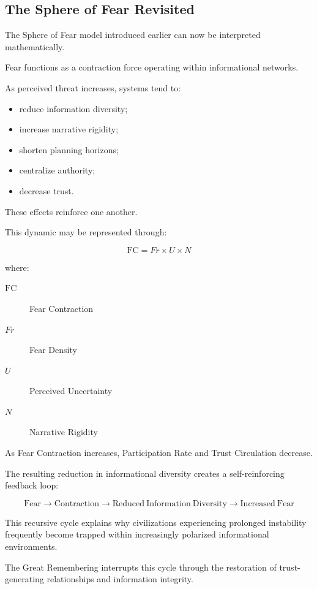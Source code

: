\documentclass[12pt]{article}
\begin{document}
\subsection{The Sphere of Fear Revisited}

The Sphere of Fear model introduced earlier can now be interpreted mathematically.

Fear functions as a contraction force operating within informational networks.

As perceived threat increases, systems tend to:

\begin{itemize}
  \item reduce information diversity;
  \item increase narrative rigidity;
  \item shorten planning horizons;
  \item centralize authority;
  \item decrease trust.
\end{itemize}

These effects reinforce one another.

This dynamic may be represented through:

\[
\mathrm{FC}=Fr \times U \times N
\]

where:

\begin{description}
  \item[\(\mathrm{FC}\)] Fear Contraction
  \item[\(Fr\)] Fear Density
  \item[\(U\)] Perceived Uncertainty
  \item[\(N\)] Narrative Rigidity
\end{description}

As Fear Contraction increases, Participation Rate and Trust Circulation decrease.

The resulting reduction in informational diversity creates a self-reinforcing feedback loop:

\[
\mathrm{Fear}\rightarrow \mathrm{Contraction}\rightarrow \mathrm{Reduced\ Information\ Diversity}\rightarrow \mathrm{Increased\ Fear}
\]

This recursive cycle explains why civilizations experiencing prolonged instability frequently become trapped within increasingly polarized informational environments.

The Great Remembering interrupts this cycle through the restoration of trust-generating relationships and information integrity.
\end{document}
